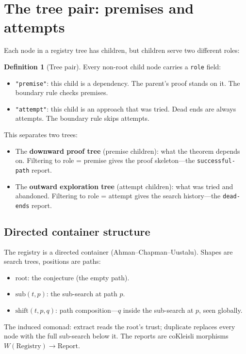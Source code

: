 \documentclass[11pt,a4paper]{article}
\newcommand{\field}[1]{\texttt{#1}}
\theoremstyle{plain}
\theoremstyle{definition}
\newtheorem{definition}[theorem]{Definition}
\begin{document}
\section{The tree pair: premises and attempts}
\label{sec:tree-pair}

Each node in a registry tree has children, but children serve two
different roles:

\begin{definition}[Tree pair]
Every non-root child node carries a \field{role} field:
\begin{itemize}
\item \field{"premise"}: this child is a dependency. The parent's proof
stands on it. The boundary rule checks premises.
\item \field{"attempt"}: this child is an approach that was tried. Dead
ends are always attempts. The boundary rule skips attempts.
\end{itemize}
\end{definition}

This separates two trees:
\begin{itemize}
\item The \textbf{downward proof tree} (premise children): what the
theorem depends on. Filtering to role = premise gives the proof
skeleton---the \texttt{successful-path} report.
\item The \textbf{outward exploration tree} (attempt children): what was
tried and abandoned. Filtering to role = attempt gives the search
history---the \texttt{dead-ends} report.
\end{itemize}

\subsection{Directed container structure}

The registry is a directed container (Ahman--Chapman--Uustalu). Shapes
are search trees, positions are paths:
\begin{itemize}
\item $\mathrm{root}$: the conjecture (the empty path).
\item $\mathrm{sub}(t, p)$: the sub-search at path $p$.
\item $\mathrm{shift}(t, p, q)$: path composition---$q$ inside the
sub-search at $p$, seen globally.
\end{itemize}

The induced comonad: $\mathrm{extract}$ reads the root's trust;
$\mathrm{duplicate}$ replaces every node with the full sub-search below
it. The reports are coKleisli morphisms $W(\text{Registry}) \to
\text{Report}$.
\end{document}
